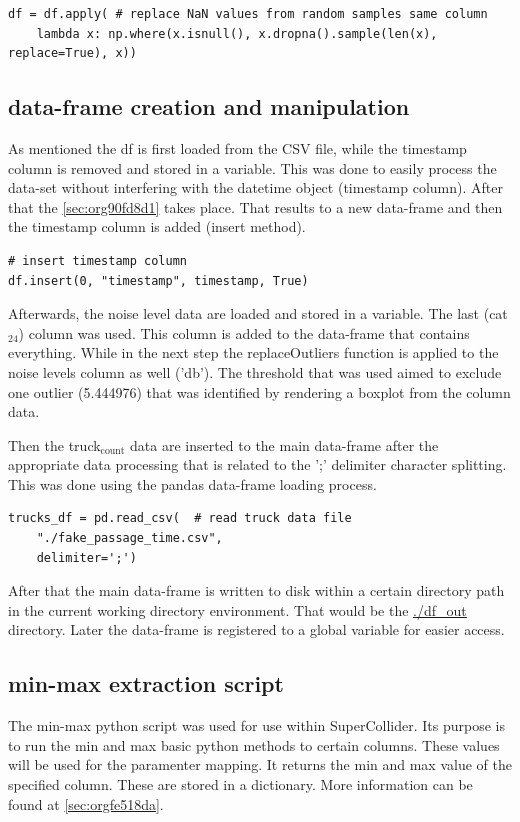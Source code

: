 \documentclass[11pt]{article}
\begin{document}
\begin{verbatim}
df = df.apply( # replace NaN values from random samples same column
    lambda x: np.where(x.isnull(), x.dropna().sample(len(x), replace=True), x))
\end{verbatim}

\subsection{data-frame creation and manipulation}
\label{sec:org87e3c01}
As mentioned the df is first loaded from the CSV file, while the timestamp column is removed and stored in a variable.  This was done to easily process the data-set without interfering with the datetime object (timestamp column).  After that the \ref{sec:org90fd8d1} takes place.  That results to a new data-frame and then the timestamp column is added (insert method).
\begin{verbatim}
# insert timestamp column
df.insert(0, "timestamp", timestamp, True)
\end{verbatim}

Afterwards, the noise level data are loaded and stored in a variable.  The last (cat\(_{\text{24}}\)) column was used.  This column is added to the data-frame that contains everything.  While in the next step the replaceOutliers function is applied to the noise levels column as well ('db').  The threshold that was used aimed to exclude one outlier (5.444976) that was identified by rendering a boxplot from the column data.

Then the truck\(_{\text{count}}\) data are inserted to the main data-frame after the appropriate data processing that is related to the ';' delimiter character splitting. This was done using the pandas data-frame loading process.

\begin{verbatim}
trucks_df = pd.read_csv(  # read truck data file
    "./fake_passage_time.csv",
    delimiter=';')
\end{verbatim}

After that the main data-frame is written to disk within a certain directory path in the current working directory environment.  That would be the \url{./df\_out} directory.
Later the data-frame is registered to a global variable for easier access.

\subsection{min-max extraction script}
\label{sec:org85ebb07}
The min-max python script was used for use within SuperCollider.  Its purpose is to run the min and max basic python methods to certain columns.  These values will be used for the paramenter mapping.  It returns the min and max value of the specified column.  These are stored in a dictionary.  More information can be found at  \ref{sec:orgfe518da}.
\end{document}
